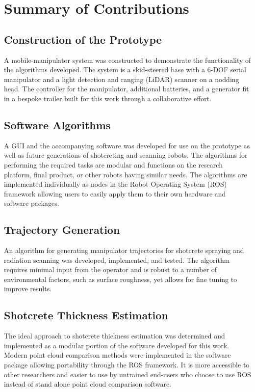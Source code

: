 \section{Summary of Contributions}
\label{sec:contributions}

\subsection{Construction of the Prototype}
A mobile-manipulator system was constructed to demonstrate the functionality of the algorithms developed. The system is a skid-steered base with a 6-DOF serial manipulator and a light detection and ranging (LiDAR) scanner on a nodding head. The controller for the manipulator, additional batteries, and a generator fit in a bespoke trailer built for this work through a collaborative effort.\\

\subsection{Software Algorithms}
A GUI and the accompanying software was developed for use on the prototype as well as future generations of shotcreting and scanning robots. The algorithms for performing the required tasks are modular and  functions on the research platform, final product, or other robots having similar needs. The algorithms are implemented individually as nodes in the Robot Operating System (ROS) framework allowing users to easily apply them to their own hardware and software packages.\\

\subsection{Trajectory Generation}
An algorithm for generating manipulator trajectories for shotcrete spraying and radiation scanning was developed, implemented, and tested. The algorithm requires minimal input from the operator and is robust to a number of environmental factors, such as surface roughness, yet allows for fine tuning to improve results.\\

\subsection{Shotcrete Thickness Estimation}
The ideal approach to shotcrete thickness estimation was determined and implemented as a modular portion of the software developed for this work. Modern point cloud comparison methods were implemented in the software package allowing portability through the ROS framework. It is more accessible to other researchers and easier to use by untrained end-users who choose to use ROS instead of stand alone point cloud comparison software.

